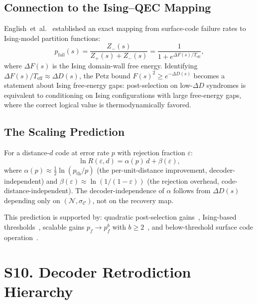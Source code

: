 \documentclass[prl,twocolumn,superscriptaddress,longbibliography]{revtex4-2}
\newcommand{\chan}{\mathcal{N}}
\newcommand{\code}{\mathcal{C}}
\begin{document}
\subsection{Connection to the Ising--QEC Mapping}

English~et~al.~\cite{EnglishEtAl2025} established an exact mapping
from surface-code failure rates to Ising-model partition functions:
\begin{equation}
p_{\mathrm{fail}}(s) = \frac{Z_{-}(s)}{Z_{+}(s) + Z_{-}(s)}
= \frac{1}{1 + e^{\Delta F(s)/T_{\mathrm{eff}}}},
\end{equation}
where $\Delta F(s)$ is the Ising domain-wall free energy. Identifying
$\Delta F(s)/T_{\mathrm{eff}} \approx \Delta D(s)$, the Petz bound
$F(s)^2 \geq e^{-\Delta D(s)}$ becomes a statement about Ising
free-energy gaps: post-selection on low-$\Delta D$ syndromes is
equivalent to conditioning on Ising configurations with large
free-energy gaps, where the correct logical value is
thermodynamically favored.

\subsection{The Scaling Prediction}

For a distance-$d$ code at error rate $p$ with rejection fraction
$\varepsilon$:
\begin{equation}
\ln R(\varepsilon, d) = \alpha(p)\, d + \beta(\varepsilon),
\end{equation}
where $\alpha(p) \approx \tfrac{1}{2}\ln(p_{\mathrm{th}}/p)$ (the
per-unit-distance improvement, decoder-independent) and
$\beta(\varepsilon) \approx \ln(1/(1-\varepsilon))$ (the rejection
overhead, code-distance-independent). The decoder-independence of
$\alpha$ follows from $\Delta D(s)$ depending only on $(\chan,
\sigma_\code)$, not on the recovery map.

This prediction is supported by: quadratic post-selection
gains~\cite{SmithBrownBartlett2024}, Ising-based
thresholds~\cite{EnglishWilliamsonBartlett2025}, scalable gains
$p_f \to p_f^b$ with $b \geq 2$~\cite{ChenEtAl2025}, and
below-threshold surface code operation~\cite{Acharya2025}.

\section{S10. Decoder Retrodiction Hierarchy}
\label{sec:decoder_hierarchy}
\end{document}
